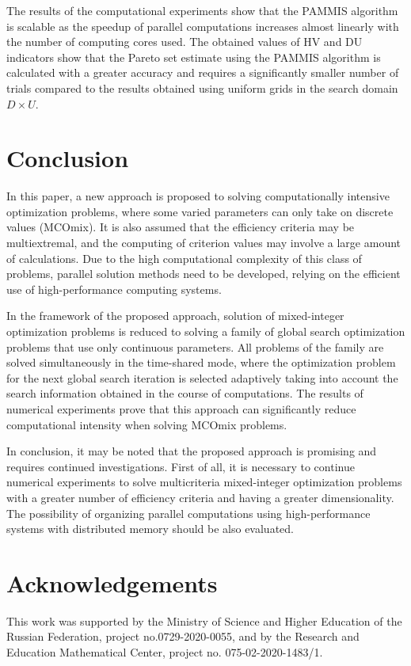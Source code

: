 \documentclass{svproc}
\begin{document}
The results of the computational experiments show that the PAMMIS algorithm is scalable as the  speedup of parallel computations increases almost linearly with the number of computing cores used. The obtained values of HV and DU indicators show that the Pareto set estimate using the PAMMIS algorithm is calculated with a greater accuracy and requires a significantly smaller number of trials compared to the results obtained using uniform grids in the search domain $D \times U$.

\section{Conclusion}

In this paper, a new approach is proposed to solving computationally intensive optimization problems, where some varied parameters can only take on discrete values (MCOmix). It is also assumed that the efficiency criteria may be multiextremal, and the computing of criterion values may involve a large amount of calculations. Due to the high computational complexity of this class of problems, parallel solution methods need to be developed, relying on the efficient use of high-performance computing systems.

In the framework of the proposed approach, solution of mixed-integer optimization problems is reduced to solving a family of global search optimization problems that use only continuous parameters. All problems of the family are solved simultaneously in the time-shared mode, where the optimization problem for the next global search iteration is selected adaptively taking into account the search information obtained in the course of computations. The results of numerical experiments prove that  this approach can significantly reduce computational intensity when solving MCOmix problems.

In conclusion, it may be noted that the proposed approach is promising and requires continued investigations. First of all, it is necessary to continue numerical experiments to solve multicriteria mixed-integer optimization problems with a greater number of efficiency criteria and having a greater dimensionality. The possibility of organizing parallel computations using high-performance systems with distributed memory should be also evaluated.



\section*{Acknowledgements} 
This work was supported by the Ministry of Science and Higher Education of the Russian Federation, project no.0729-2020-0055, and by the Research and Education Mathematical Center, project no. 075-02-2020-1483/1.
\end{document}

